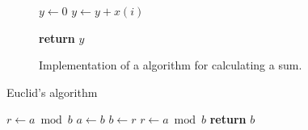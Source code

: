 \documentclass{article}
\begin{document}
\begin{figure}[!htbp]
    \begin{algorithmic}[1]


        \State $y\gets0$
         
        \State $y\gets y+x(i)$ 
        \EndFor

        \State \textbf{return}  $y$
        \EndProcedure
    \end{algorithmic}
    \caption[Implementation of a algorithm for calculating a sum.]{Implementation of a algorithm for calculating a sum.}
    \label{fig:algorithm1}
\end{figure}

\begin{algorithm}
    \caption{Euclid’s algorithm}\label{euclid}
    \begin{algorithmic}[1]
        \State $r\gets a\bmod b$
        \State $a\gets b$
        \State $b\gets r$
        \State $r\gets a\bmod b$
        \EndWhile\label{euclidendwhile}
        \State \textbf{return} $b$
        \EndProcedure
    \end{algorithmic}
\end{algorithm}
\end{document}
